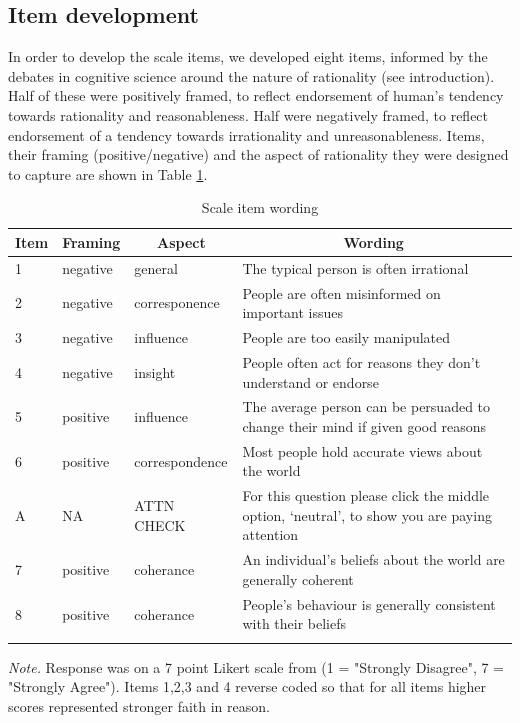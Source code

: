 \documentclass[
  ,jou,floatsintext]{apa6}
\begin{document}
\hypertarget{item-development}{%
\subsection{Item development}\label{item-development}}

In order to develop the scale items, we developed eight items, informed by the debates in cognitive science around the nature of rationality (see introduction). Half of these were positively framed, to reflect endorsement of human's tendency towards rationality and reasonableness. Half were negatively framed, to reflect endorsement of a tendency towards irrationality and unreasonableness. Items, their framing (positive/negative) and the aspect of rationality they were designed to capture are shown in Table \ref{tab:items}.

\begin{table}[tbp]

\begin{center}
\begin{threeparttable}

\caption{\label{tab:items}Scale item wording}

\begin{tabular}{llll}
\toprule
Item & \multicolumn{1}{c}{Framing} & \multicolumn{1}{c}{Aspect} & \multicolumn{1}{c}{Wording}\\
\midrule
1 & negative & general & The typical person is often irrational\\
2 & negative & corresponence & People are often misinformed on important issues\\
3 & negative & influence & People are too easily manipulated\\
4 & negative & insight & People often act for reasons they don’t understand or endorse\\
5 & positive & influence & The average person can be persuaded to change their mind if given good reasons\\
6 & positive & correspondence & Most people hold accurate views about the world\\
A & NA & ATTN CHECK & For this question please click the middle option, ‘neutral’, to show you are paying attention\\
7 & positive & coherance & An individual's beliefs about the world are generally coherent\\
8 & positive & coherance & People's behaviour is generally consistent with their beliefs\\
\bottomrule
\addlinespace
\end{tabular}

\begin{tablenotes}[para]
\normalsize{\textit{Note.} Response was on a 7 point Likert scale from (1 = "Strongly Disagree", 7 = "Strongly Agree"). Items 1,2,3 and 4 reverse coded so that for all items higher scores represented stronger faith in reason.}
\end{tablenotes}

\end{threeparttable}
\end{center}

\end{table}
\end{document}
